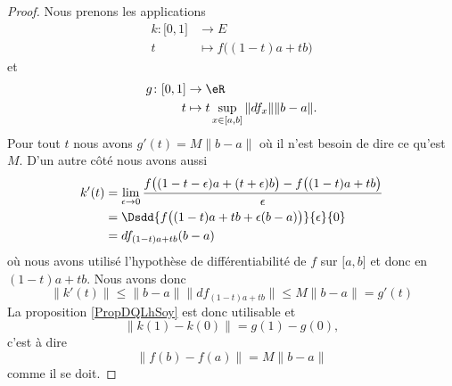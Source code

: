 \begin{proof}
    Nous prenons les applications
    \begin{equation}
        \begin{aligned}
            k\colon \mathopen[ 0 , 1 \mathclose]&\to E \\
            t&\mapsto f\big( (1-t)a+tb \big) 
        \end{aligned}
    \end{equation}
    et
    \begin{equation}
        \begin{aligned}
            g\colon \mathopen[ 0 , 1 \mathclose]&\to \eR \\
            t&\mapsto t\sup_{x\in\mathopen[ a , b \mathclose]}\| df_x \|\| b-a \|.
        \end{aligned}
    \end{equation}
    Pour tout \( t\) nous avons \( g'(t)=M\| b-a \|\) où il n'est besoin de dire ce qu'est \( M\). D'un autre côté nous avons aussi
    \begin{equation}
        \begin{aligned}[]
            k'(t)&=\lim_{\epsilon\to 0}\frac{ f\big( (1-t-\epsilon)a+(t+\epsilon)b \big)-f\big( (1-t)a+tb \big) }{ \epsilon }\\
            &=\Dsdd{ f\big( (1-t)a+tb+\epsilon(b-a) \big)  }{\epsilon}{0}\\
            &=df_{(1-t)a+tb}(b-a)
        \end{aligned}
    \end{equation}
    où nous avons utilisé l'hypothèse de différentiabilité de \( f\) sur \( \mathopen[ a , b \mathclose]\) et donc en \( (1-t)a+tb\). Nous avons donc
    \begin{equation}
        \| k'(t) \|\leq \| b-a \|\| df_{(1-t)a+tb} \|\leq M\| b-a \|=g'(t)
    \end{equation}
    La proposition \ref{PropDQLhSoy} est donc utilisable et
    \begin{equation}
        \| k(1)-k(0) \|=g(1)-g(0),
    \end{equation}
    c'est à dire
    \begin{equation}
        \| f(b)-f(a) \|=M\| b-a \|
    \end{equation}
    comme il se doit.
\end{proof}

